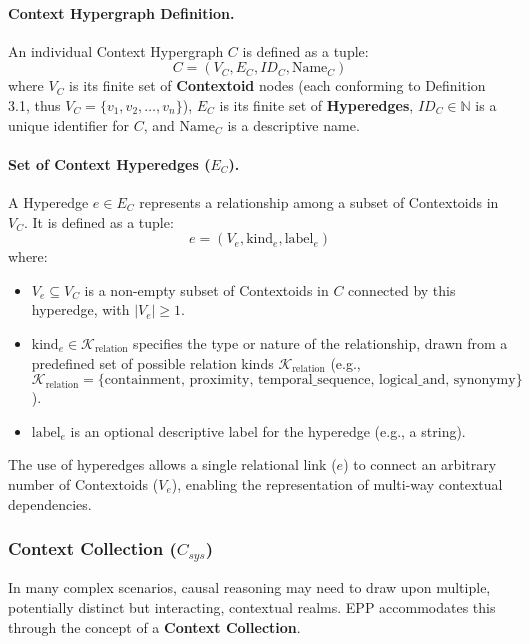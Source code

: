     \paragraph*{Context Hypergraph Definition.} 
    An individual Context Hypergraph \( C \) is defined as a tuple:
    \[ C = (V_C, E_C, ID_C, \text{Name}_C) \]
    where \(V_C\) is its finite set of \textbf{Contextoid} nodes (each conforming to Definition 3.1, thus \( V_C = \{v_1, v_2, \dots, v_n\} \)), \(E_C\) is its finite set of \textbf{Hyperedges}, \(ID_C \in \mathbb{N}\) is a unique identifier for \(C\), and \(\text{Name}_C\) is a descriptive name.

    \paragraph*{Set of Context Hyperedges (\(E_C\)).}
    A Hyperedge \( e \in E_C \) represents a relationship among a subset of Contextoids in \(V_C\). It is defined as a tuple:
    \[ e = (V_e, \text{kind}_e, \text{label}_e) \]
    where:
    \begin{itemize} \setlength\itemsep{0em} %
        \item \( V_e \subseteq V_C \) is a non-empty subset of Contextoids in \(C\) connected by this hyperedge, with \(|V_e| \ge 1\).
        \item \( \text{kind}_e \in \mathcal{K}_{\text{relation}} \) specifies the type or nature of the relationship, drawn from a predefined set of possible relation kinds \(\mathcal{K}_{\text{relation}}\) (e.g., \(\mathcal{K}_{\text{relation}} = \{\text{containment, proximity, temporal\_sequence, logical\_and, synonymy}\}\)).
        \item \( \text{label}_e \) is an optional descriptive label for the hyperedge (e.g., a string).
    \end{itemize}
    The use of hyperedges allows a single relational link (\(e\)) to connect an arbitrary number of Contextoids (\(V_e\)), enabling the representation of multi-way contextual dependencies.

\subsubsection[Context Collection (C\_sys)]{Context Collection (\(C_{sys}\))} 
    \label{ssec:context_collection_formal}

    In many complex scenarios, causal reasoning may need to draw upon multiple, potentially distinct but interacting, contextual realms. EPP accommodates this through the concept of a \textbf{Context Collection}.

